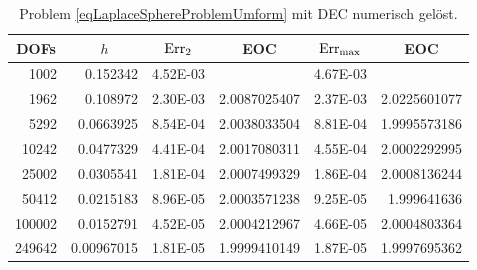 \begin{beispiel}[Einheitssphäre]
       \begin{table}[htbp]
       \centering
       \begin{tabular}{|r|r|r|r|r|r|}
       \hline
       \multicolumn{1}{|c|}{DOFs} & \multicolumn{1}{c|}{\( h \)} & \multicolumn{1}{c|}{\( \text{Err}_{2} \)} & \multicolumn{1}{c|}{EOC} &
       \multicolumn{1}{c|}{ \( \text{Err}_{\max} \)} & \multicolumn{1}{c|}{EOC} \\ \hline
        1002 & 0.152342 & 4.52E-03 & \multicolumn{1}{l|}{} & 4.67E-03 & \multicolumn{1}{l|}{} \\ \hline
        1962 & 0.108972 & 2.30E-03 & 2.0087025407 & 2.37E-03 & 2.0225601077 \\ \hline
        5292 & 0.0663925 & 8.54E-04 & 2.0038033504 & 8.81E-04 & 1.9995573186 \\ \hline
        10242 & 0.0477329 & 4.41E-04 & 2.0017080311 & 4.55E-04 & 2.0002292995 \\ \hline
        25002 & 0.0305541 & 1.81E-04 & 2.0007499329 & 1.86E-04 & 2.0008136244 \\ \hline
        50412 & 0.0215183 & 8.96E-05 & 2.0003571238 & 9.25E-05 & 1.999641636 \\ \hline
        100002 & 0.0152791 & 4.52E-05 & 2.0004212967 & 4.66E-05 & 2.0004803364 \\ \hline
        249642 & 0.00967015 & 1.81E-05 & 1.9999410149 & 1.87E-05 & 1.9997695362 \\ \hline
       \end{tabular}
       \caption[Laplace auf Sphäre (DEC)]{Problem \eqref{eqLaplaceSphereProblemUmform} mit DEC numerisch gelöst.}
       \label{tabLaplaceSphereDEC}
       \end{table}
       

\end{beispiel}

